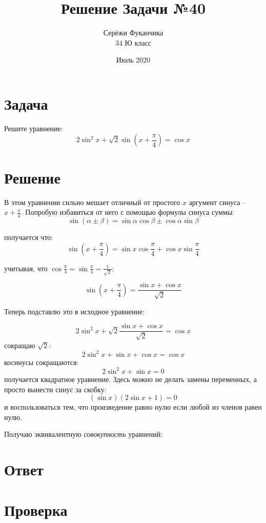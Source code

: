 \documentclass{article}
\title{Решение Задачи №40}
\author{Серёжи Фуканчика\\34 Ю класс}
\date{Июль 2020}
\begin{document}
\maketitle

\section{Задача}
Решите уравнение:
$$2\sin^2{x}+\sqrt{2}\sin\left(x+\frac{\pi}{4}\right)=\cos{x}$$

\section{Решение}
В этом уравнении сильно мешает отличный от простого $x$ аргумент синуса -- $x+\frac{\pi}{4}$. Попробую избавиться от него с помощью формулы синуса суммы:
$$\sin \left( \alpha \pm \beta \right) = \sin \alpha \cos \beta \pm \cos \alpha \sin \beta $$

получается что:
$$\sin{\left(x+\frac{\pi}{4}\right)}=\sin{x}\cos{\frac{\pi}{4}} + \cos{x}\sin{\frac{\pi}{4}}$$

учитывая, что $\cos{\frac{\pi}{4}}=\sin{\frac{\pi}{4}}=\frac{1}{\sqrt{2}}$:

$$\sin{\left(x+\frac{\pi}{4}\right)}=\frac{\sin{x} + \cos{x}}{\sqrt{2}}$$

Теперь подставлю это в исходное уравнение:

$$2\sin^2{x}+\sqrt{2}\frac{\sin{x} + \cos{x}}{\sqrt{2}}=\cos{x}$$
сокращаю $\sqrt{2}$:
$$2\sin^2{x}+\sin{x} + \cos{x} = \cos{x}$$
косинусы сокращаются:
$$2\sin^2{x}+\sin{x} = 0$$
получается квадратное уравнение. Здесь можно не делать замены переменных, а просто вынести синус за скобку:
$$(\sin{x})(2\sin{x} + 1) = 0$$
и воспользоваться тем, что произведение равно нулю если любой из членов равен нулю. 

Получаю эквивалентную \textit{совокупность} уравнений:

\section{Ответ}

\section{Проверка}
\end{document}
